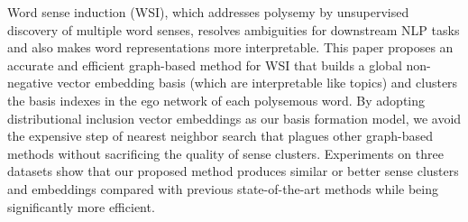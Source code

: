 Word sense induction (WSI), which addresses polysemy by unsupervised discovery of multiple word senses, resolves ambiguities for downstream NLP tasks and also makes word representations more interpretable. This paper proposes an accurate and efficient graph-based method for WSI that builds a global non-negative vector embedding basis (which are interpretable like topics) and clusters the basis indexes in the ego network of each polysemous word. By adopting distributional inclusion vector embeddings as our basis formation model, we avoid the expensive step of nearest neighbor search that plagues other graph-based methods without sacrificing the quality of sense clusters. Experiments on three datasets show that our proposed method produces similar or better sense clusters and embeddings compared with previous state-of-the-art methods while being significantly more efficient.
